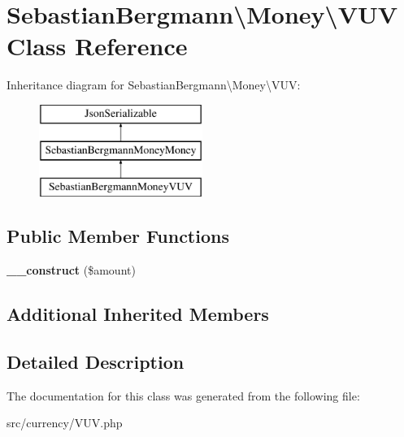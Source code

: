 \hypertarget{classSebastianBergmann_1_1Money_1_1VUV}{}\section{Sebastian\+Bergmann\textbackslash{}Money\textbackslash{}V\+U\+V Class Reference}
\label{classSebastianBergmann_1_1Money_1_1VUV}
Inheritance diagram for Sebastian\+Bergmann\textbackslash{}Money\textbackslash{}V\+U\+V\+:\begin{figure}[H]
\begin{center}
\leavevmode
\includegraphics[height=3.000000cm]{classSebastianBergmann_1_1Money_1_1VUV}
\end{center}
\end{figure}
\subsection*{Public Member Functions}
\begin{DoxyCompactItemize}
\item 
\hypertarget{classSebastianBergmann_1_1Money_1_1VUV_a1775bd1689c37ad653049c3f1e12568b}{}{\bfseries \+\_\+\+\_\+construct} (\$amount)\label{classSebastianBergmann_1_1Money_1_1VUV_a1775bd1689c37ad653049c3f1e12568b}

\end{DoxyCompactItemize}
\subsection*{Additional Inherited Members}


\subsection{Detailed Description}


The documentation for this class was generated from the following file\+:\begin{DoxyCompactItemize}
\item 
src/currency/V\+U\+V.\+php\end{DoxyCompactItemize}
